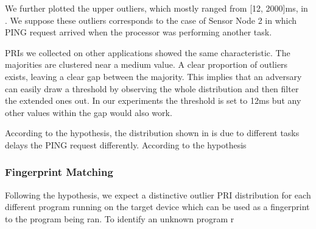 We further plotted the upper outliers, which mostly ranged from [12, 2000]ms, in . We suppose these outliers corresponds to the case of Sensor Node 2 in  which PING request arrived when the processor was performing another task.

PRIs we collected on other applications showed the same characteristic. The majorities are clustered near a medium value. A clear proportion of outliers exists, leaving a clear gap between the majority. This implies that an adversary can easily draw a threshold by observing the whole distribution and then filter the extended ones out. In our experiments the threshold is set to 12ms but any other values within the gap would also work. 

According to the hypothesis, the  distribution shown in  is due to different tasks delays the PING request differently. According to the hypothesis


\subsubsection{Fingerprint Matching}
Following the hypothesis, we expect a distinctive outlier PRI distribution for each different program running on the target device which can be used as a fingerprint to the program being ran. To identify an unknown program r
